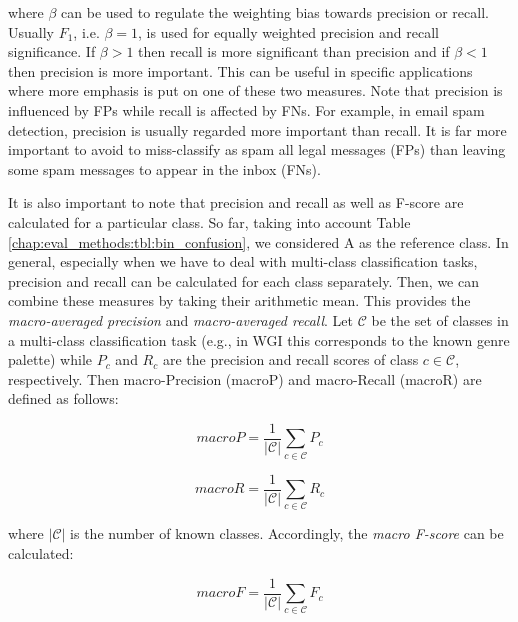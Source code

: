 \noindent
where $\beta$ can be used to regulate the weighting bias towards precision or recall. Usually $F_{1}$, i.e. $\beta = 1$, is used for equally weighted precision and recall significance. If $\beta > 1$ then recall is more significant than precision and if $\beta < 1$ then precision is more important. This can be useful in specific applications where more emphasis is put on one of these two measures. Note that precision is influenced by FPs while recall is affected by FNs. For example, in email spam detection, precision is usually regarded more important than recall. It is far more important to avoid to miss-classify as spam all legal messages (FPs) than leaving some spam messages to appear in the inbox (FNs).

It is also important to note that precision and recall as well as F-score are calculated for a particular class. So far, taking into account Table \ref{chap:eval_methods:tbl:bin_confusion}, we considered A as the reference class. In general, especially when we have to deal with multi-class classification tasks, precision and recall can be calculated for each class separately. Then, we can combine these measures by taking their arithmetic mean. This provides the \textit{macro-averaged precision} and \textit{macro-averaged recall}. Let $\mathcal{C}$ be the set of classes in a multi-class classification task (e.g., in WGI this corresponds to the known genre palette) while $P_c$ and $R_c$ are the precision and recall scores of class $c \in \mathcal{C}$, respectively. Then macro-Precision (macroP) and macro-Recall (macroR) are defined as follows:

\begin{equation}\label{chap:eval_methods:eq:macro-precision}
	macroP = \frac{1}{|\mathcal{C}|} \sum_{c \in \mathcal{C}}{P_c}
\end{equation}

\begin{equation}\label{chap:eval_methods:eq:macro-recall}
	macroR = \frac{1}{|\mathcal{C}|} \sum_{c \in \mathcal{C}}{R_c}
\end{equation}

\noindent where $|\mathcal{C}|$ is the number of known classes. Accordingly, the \textit{macro F-score} can be calculated: 

\begin{equation}\label{chap:eval_methods:eq:macro-F}
	macroF = \frac{1}{|\mathcal{C}|} \sum_{c \in \mathcal{C}}{F_c}
\end{equation}


